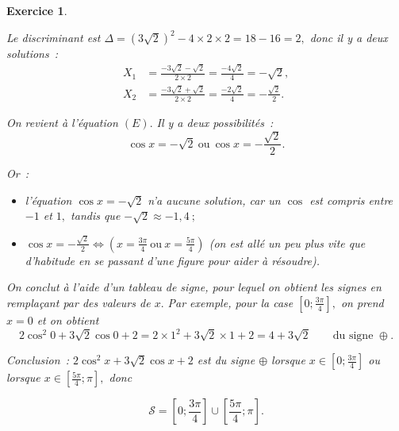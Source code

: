 \documentclass[10pt]{article}
\newtheorem{exo}{Exercice}
\begin{document}
\begin{exo}
\begin{enumerate}
\begin{multicols}{2}
Le discriminant est $\Delta=\left(3\sqrt{2}\right)^2-4\times 2\times 2=18-16=2,$ donc il y a deux solutions~:
\begin{align*}
X_1&=\frac{-3\sqrt{2}-\sqrt{2}}{2\times 2}=\frac{-4\sqrt{2}}{4}=-\sqrt{2},
\\ X_2&=\frac{-3\sqrt{2}+\sqrt{2}}{2\times 2}=\frac{-2\sqrt{2}}{4}=-\frac{\sqrt{2}}{2}.
\end{align*}

\medskip

On revient à l'équation $(E).$ Il y a deux possibilités~:
\[\cos x=-\sqrt{2}~\text{ou}~\cos x=-\frac{\sqrt{2}}{2}.\]

Or~:
\begin{itemize}
\item[\textbullet] l'équation $\cos x=-\sqrt{2}$ n'a aucune solution, car un $\cos$ est compris entre $-1$ et $1,$ tandis que $-\sqrt{2}\approx -1,4~;$
\item[\textbullet] $\cos x=-\frac{\sqrt{2}}{2}\iff \left(x=\frac{3\pi}{4}~\text{ou}~x=\frac{5\pi}{4}\right)$ (on est allé un peu plus vite que d'habitude en se passant d'une figure pour aider à résoudre).
\end{itemize}

\medskip

On conclut à l'aide d'un tableau de signe, pour lequel on obtient les signes en remplaçant par des valeurs de $x.$ Par exemple, pour la case $\left[0;\frac{3\pi}{4}\right],$ on prend $x=0$ et on obtient
\[2\cos^2 0+3\sqrt{2}\cos 0+2=2\times 1^2+3\sqrt{2}\times 1+2=4+3\sqrt{2}\qquad\text{du signe }\oplus.\]

\medskip
\begin{center}
\end{center}

\medskip
 
Conclusion~: $2\cos^2 x+3\sqrt{2}\cos x+2$ est du signe $\oplus$ lorsque  $x\in\left[0;\frac{3\pi}{4}\right]$ ou lorsque $x\in\left[\frac{5\pi}{4};\pi\right],$ donc

 \[\boxed{\mathcal{S}=\left[0;\frac{3\pi}{4}\right]\cup \left[\frac{5\pi}{4};\pi\right].}\]



\end{multicols}


\end{enumerate}
\end{exo}
\end{document}
